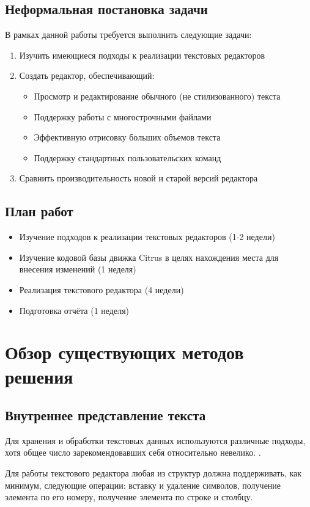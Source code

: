 \documentclass{fefu}
\begin{document}
		\subsection{Неформальная постановка задачи}
			В рамках данной работы требуется выполнить следующие задачи:
			\begin{enumerate}
				\item Изучить имеющиеся подходы к реализации текстовых редакторов
				\item Создать редактор, обеспечивающий:
				\begin{itemize}
					\setlength{\itemindent}{-3em}
					\item Просмотр и редактирование обычного (не стилизованного) текста
					\item Поддержку работы с многострочными файлами
					\item Эффективную отрисовку больших объемов текста
					\item Поддержку стандартных пользовательских команд
				\end{itemize}
				\item Сравнить производительность новой и старой версий редактора
			\end{enumerate}
		\subsection{План работ}
			\begin{itemize}
				\item Изучение подходов к реализации текстовых редакторов (1-2 недели)
				\item Изучение кодовой базы движка Citrus в целях нахождения места для внесения
				изменений (1 неделя)
				\item Реализация текстового редактора (4 недели)
				\item Подготовка отчёта (1 неделя)
			\end{itemize}
	\section{Обзор существующих методов решения}
		\subsection{Внутреннее представление текста}
			\par Для хранения и обработки текстовых данных используются различные подходы,
				хотя общее число зарекомендовавших себя относительно невелико.
				\cite{TextEditorDataStructures}.
			\par Для работы текстового редактора любая из структур должна поддерживать, как 
			минимум, следующие операции: вставку и удаление символов, получение элемента по его
			номеру, получение элемента по строке и столбцу.
\end{document}
